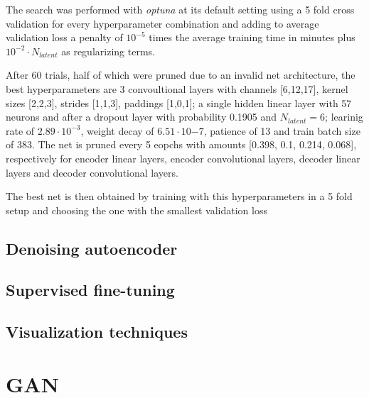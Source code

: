\documentclass[a4paper, 11pt]{article}
\begin{document}
  The search was performed with \emph{optuna} at its default setting using a 5 fold cross validation for every hyperparameter combination and adding to average validation loss a penalty of $10^{-5}$ times the average training time in minutes plus $10^{-2} \cdot N_{latent}$ as regularizing terms.

  After 60 trials, half of which were pruned due to an invalid net architecture, the best hyperparameters are 3 convoultional layers with channels [6,12,17], kernel sizes [2,2,3], strides [1,1,3], paddings [1,0,1]; a single hidden linear layer with 57 neurons and after a dropout layer with probability 0.1905 and $N_{latent} = 6$; learinig rate of $2.89\cdot10^{-3}$, weight decay of $6.51\cdot10{-7}$, patience of 13 and train batch size of 383. The net is pruned every 5 eopchs with amounts [0.398, 0.1, 0.214, 0.068], respectively for encoder linear layers, encoder convolutional layers, decoder linear layers and decoder convolutional layers.

  The best net is then obtained by training with this hyperparameters in a 5 fold setup and choosing the one with the smallest validation loss

\subsection{Denoising autoencoder}

\subsection{Supervised fine-tuning}

\subsection{Visualization techniques}


\section{GAN}
\end{document}
